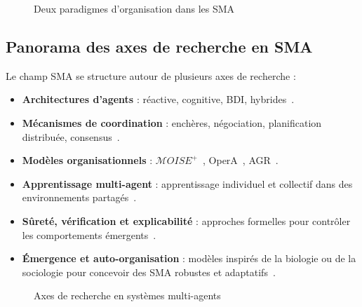 \documentclass[ twoside,openright,titlepage,numbers=noenddot,headinclude,%
                footinclude=true,cleardoublepage=empty,abstractoff, %
                BCOR=5mm,paper=a4,fontsize=11pt,%
                french,american,%
                ]{scrreprt}
\begin{document}
\begin{figure}[h]
    \centering
    \caption{Deux paradigmes d'organisation dans les SMA}
    \label{fig:auto_vs_topdown}
\end{figure}

\subsection*{Panorama des axes de recherche en SMA}

Le champ SMA se structure autour de plusieurs axes de recherche :

\begin{itemize}
    \item \textbf{Architectures d'agents} : réactive, cognitive, BDI, hybrides~\cite{Georgeff1999}.
    \item \textbf{Mécanismes de coordination} : enchères, négociation, planification distribuée, consensus~\cite{Sandholm1999,Durfee1999}.
    \item \textbf{Modèles organisationnels} : $\mathcal{M}OISE^+$~\cite{Hubner2002,Hannoun2000}, OperA~\cite{Dignum2004}, AGR~\cite{Ferber2003}.
    \item \textbf{Apprentissage multi-agent} : apprentissage individuel et collectif dans des environnements partagés~\cite{Zhang2021}.
    \item \textbf{Sûreté, vérification et explicabilité} : approches formelles pour contrôler les comportements émergents~\cite{Boella2008}.
    \item \textbf{Émergence et auto-organisation} : modèles inspirés de la biologie ou de la sociologie pour concevoir des SMA robustes et adaptatifs~\cite{DiMarzoSerugendo2005,Heylighen2001}.
\end{itemize}

\begin{figure}[h]
    \centering
    \caption{Axes de recherche en systèmes multi-agents}
    \label{fig:panorama_sma}
\end{figure}
\end{document}
